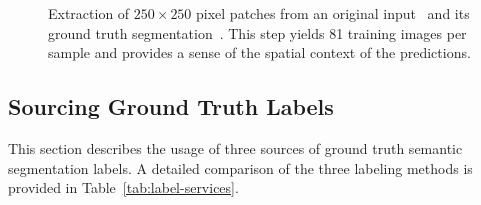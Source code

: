 \documentclass[11pt]{article} %
\begin{document}
\begin{figure}
\centering
{}
\caption{Extraction of $250 \times 250$ pixel patches from an 
original input~ and its ground truth
segmentation~. This step yields 81 training 
images per sample and provides a sense of the spatial context of the
predictions.}
\label{fig:original-to-patch}
\end{figure}

\subsection{Sourcing Ground Truth Labels}

This section describes the usage of three sources of ground truth semantic 
segmentation labels. A detailed comparison of the three labeling methods is 
provided in Table~\ref{tab:label-services}.
\end{document}
